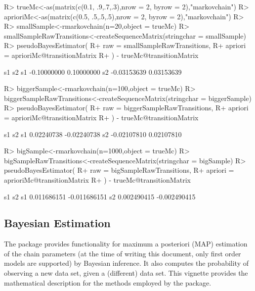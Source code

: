 \documentclass[article,nojss]{jss}
\begin{document}
\begin{CodeChunk}

\begin{CodeInput}
R> trueMc<-as(matrix(c(0.1, .9,.7,.3),nrow = 2, byrow = 2),"markovchain")
R> aprioriMc<-as(matrix(c(0.5, .5,.5,.5),nrow = 2, byrow = 2),"markovchain")
R> 
R> smallSample<-rmarkovchain(n=20,object = trueMc)
R> smallSampleRawTransitions<-createSequenceMatrix(stringchar = smallSample)
R> pseudoBayesEstimator(
R+   raw = smallSampleRawTransitions, 
R+   apriori = aprioriMc@transitionMatrix
R+ ) - trueMc@transitionMatrix
\end{CodeInput}

\begin{CodeOutput}
            s1         s2
s1 -0.10000000 0.10000000
s2 -0.03153639 0.03153639
\end{CodeOutput}

\begin{CodeInput}
R> biggerSample<-rmarkovchain(n=100,object = trueMc)
R> biggerSampleRawTransitions<-createSequenceMatrix(stringchar = biggerSample)
R> pseudoBayesEstimator(
R+   raw = biggerSampleRawTransitions,
R+   apriori = aprioriMc@transitionMatrix
R+ ) - trueMc@transitionMatrix
\end{CodeInput}

\begin{CodeOutput}
            s1          s2
s1  0.02240738 -0.02240738
s2 -0.02107810  0.02107810
\end{CodeOutput}

\begin{CodeInput}
R> bigSample<-rmarkovchain(n=1000,object = trueMc)
R> bigSampleRawTransitions<-createSequenceMatrix(stringchar = bigSample)
R> pseudoBayesEstimator(
R+   raw = bigSampleRawTransitions,
R+   apriori = aprioriMc@transitionMatrix
R+ ) - trueMc@transitionMatrix
\end{CodeInput}

\begin{CodeOutput}
            s1           s2
s1 0.011686151 -0.011686151
s2 0.002490415 -0.002490415
\end{CodeOutput}
\end{CodeChunk}

\hypertarget{bayesian-estimation}{%
\subsection{Bayesian Estimation}\label{bayesian-estimation}}

The  package provides functionality for maximum a posteriori (MAP) estimation of the chain parameters (at the time of writing this document, only first order models are supported) by Bayesian inference. It also computes the probability of observing a new data set, given a (different) data set. This vignette provides the mathematical description for the methods employed by the package.
\end{document}

